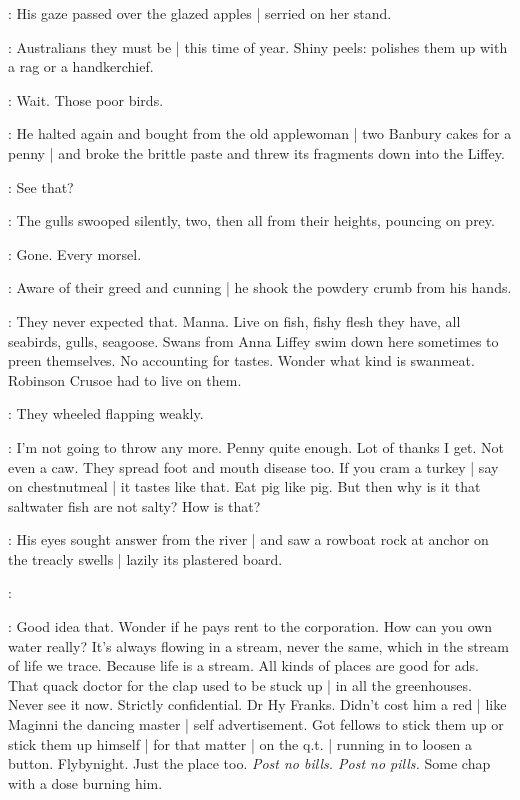 :
His gaze passed over the glazed apples |
serried on her stand.

\BloomInt:
Australians they must be |
this time of year.
Shiny peels:
polishes them up
with a rag or a handkerchief.

\BloomInt:
Wait.
Those poor birds.

:
He halted again and bought from the old applewoman |
two Banbury cakes for a penny |
and broke the brittle paste
and threw its fragments down into the Liffey.

\BloomInt:
See that?

:
The gulls swooped silently,
two,
then all from their heights,
pouncing on prey.

\BloomInt:
Gone.
Every morsel.

:
Aware of their greed and cunning |
he shook the powdery crumb from his hands.

\BloomInt:
They never expected that.
Manna.
Live on fish,
fishy flesh they have,
all seabirds,
gulls,
seagoose.
Swans from Anna Liffey swim down here sometimes
to preen themselves.
No accounting for tastes.
Wonder what kind is swanmeat.
Robinson Crusoe had to live on them.

:
They wheeled flapping weakly.

\BloomInt:
I'm not going to throw any more.
Penny quite enough.
Lot of thanks I get.
Not even a caw.
They spread foot and mouth disease too.
If you cram a turkey |
say on chestnutmeal |
it tastes like that.
Eat pig like pig.
But then why is it that saltwater fish are not salty?
How is that?

:
His eyes sought answer from the river |
and saw a rowboat rock at anchor on the treacly swells |
lazily its plastered board.

:


\BloomInt:
Good idea that.
Wonder if he pays rent to the corporation.
How can you own water really?
It's always flowing in a stream,
never the same,
which in the stream of life we trace.
Because life is a stream.
All kinds of places are good for ads.
That quack doctor for the clap used to be stuck up |
in all the greenhouses.
Never see it now.
Strictly confidential.
Dr Hy Franks.
Didn't cost him a red |
like Maginni the dancing master |
self advertisement.
Got fellows to stick them up
or stick them up himself |
for that matter |
on the q.t. |
running in to loosen a button.
Flybynight.
Just the place too.
\emph{Post no bills.
Post no pills.}
Some chap with a dose burning him.

